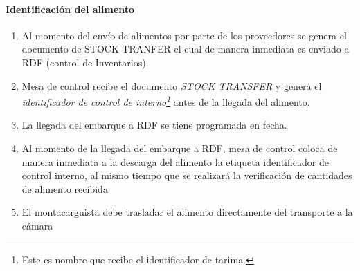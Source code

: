 

\paragraph{Identificación del alimento}

\begin{enumerate}
	\item Al momento del envío de alimentos por parte de los proveedores se genera el documento de STOCK TRANFER el cual de manera inmediata es enviado a \gls{RDF} (control de Inventarios).
	\item Mesa de control recibe el documento \textit{STOCK TRANSFER} y genera el \emph{identificador de control de interno\footnote{Este es nombre que recibe el identificador de tarima.}} antes de la llegada del alimento.
	\item La llegada del embarque a \gls{RDF} se tiene programada en fecha.
	\item Al momento de la llegada del embarque a \gls{RDF}, mesa de control coloca de manera inmediata a la descarga del alimento la etiqueta identificador de control interno, al mismo tiempo que se realizará la verificación de cantidades de alimento recibida
	\item El montacarguista debe trasladar el alimento directamente del transporte a la cámara
\end{enumerate}

